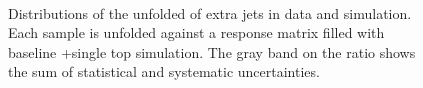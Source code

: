 \begin{figure}
\centering
{}
 \\
\caption{Distributions of the unfolded \pt of extra jets in data and simulation. Each sample is unfolded against a response matrix filled with baseline \ttbar+single top simulation. The gray band on the ratio shows the sum of statistical and systematic uncertainties.}
 \label{fig:unfptlosys}
 \end{figure}
